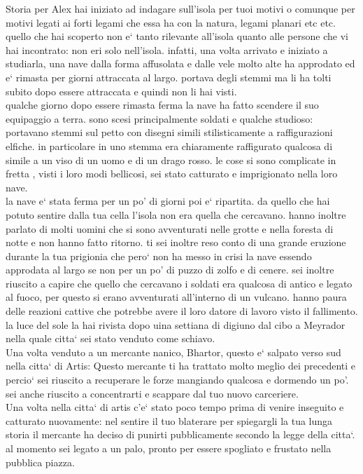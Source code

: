 \begin{commentbox}{Storia per Alex}
  hai iniziato ad indagare sull'isola per tuoi motivi o comunque per motivi legati ai forti legami che essa ha con la natura, legami planari etc etc. quello che hai scoperto non e` tanto rilevante all'isola quanto alle persone che vi hai incontrato: non eri solo nell'isola. infatti, una volta arrivato e iniziato a studiarla, una nave dalla forma affusolata e dalle vele molto alte ha approdato ed e` rimasta per giorni attraccata al largo. portava degli stemmi ma li ha tolti subito dopo essere attraccata e quindi non li hai visti. \\
  qualche giorno dopo essere rimasta ferma la nave ha fatto scendere il suo equipaggio a terra. sono scesi principalmente soldati e qualche studioso: portavano stemmi sul petto con disegni simili stilisticamente a raffigurazioni elfiche. in particolare in uno stemma era chiaramente raffigurato qualcosa di simile a un viso di un uomo e di un drago rosso. le cose si sono complicate in fretta , visti i loro modi bellicosi, sei stato catturato e imprigionato nella loro nave. \\
  la nave e` stata ferma per un po' di giorni poi e` ripartita. da quello che hai potuto sentire dalla tua cella l'isola non era quella che cercavano. hanno inoltre parlato di molti uomini che si sono avventurati nelle grotte e nella foresta di notte e non hanno fatto ritorno. ti sei inoltre reso conto di una grande eruzione durante la tua prigionia che pero` non ha messo in crisi la nave essendo approdata al largo se non per un po' di puzzo di zolfo e di cenere. sei inoltre riuscito a capire che quello che cercavano i soldati era qualcosa di antico e legato al fuoco, per questo si erano avventurati all'interno di un vulcano. hanno paura delle reazioni cattive che potrebbe avere il loro datore di lavoro visto il fallimento. la luce del sole la hai rivista dopo uina settiana di digiuno dal cibo a Meyrador nella quale citta` sei stato venduto come schiavo. \\
  Una volta venduto a un mercante nanico, Bhartor, questo e` salpato verso sud nella citta` di Artis: Questo mercante ti ha trattato molto meglio dei precedenti e percio` sei riuscito a recuperare le forze mangiando qualcosa e dormendo un po'. sei anche riuscito a concentrarti e scappare dal tuo nuovo carceriere. \\
  Una volta nella citta` di artis c'e` stato poco tempo prima di venire inseguito e catturato nuovamente: nel sentire il tuo blaterare per spiegargli la tua lunga storia il mercante ha deciso di punirti pubblicamente secondo la legge della citta`. al momento sei legato a un palo, pronto per essere spogliato e frustato nella pubblica piazza.
\end{commentbox}